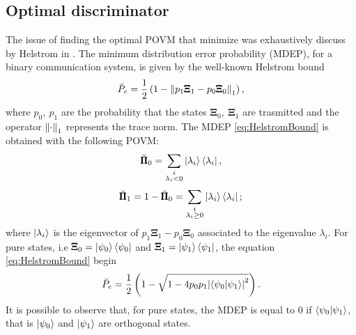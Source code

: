     \subsection{Optimal discriminator}
    The issue of finding the optimal POVM that minimize was exhaustively discuss  by Helstrom in 
    \cite{helstrom3,helstrom4}. The minimum distribution error probability (MDEP), for a binary 
    communication system, is given by the well-known Helstrom bound
    \begin{equation}
        \breve{P}_e = \frac{1}{2} \left(1-\norm{p_1 \pmb{\Xi}_1 - p_0 \pmb{\Xi}_0}_1 \right),
        \label{eq:HelstromBound}
    \end{equation}
    where $p_0,\ p_1$ are the probability that the states $\pmb{\Xi}_0,\ \pmb{\Xi}_1$ are trasmitted
    and the operator $\norm{\cdot}_1$ represents the trace norm. 
    The MDEP \ref{eq:HelstromBound} is obtained with the following POVM:
    \begin{equation}
        \breve{\pmb{\Pi}}_0 = \sum_{\substack{i \\ \lambda_i<0}} \ket{\lambda_i}\bra{\lambda_i},
    \end{equation}
    \begin{equation*}
        \breve{\pmb{\Pi}}_1 = 1-\breve{\pmb{\Pi}}_0 = 
        \sum_{\substack{i \\ \lambda_i \geq 0}} \ket{\lambda_i}\bra{\lambda_i};
    \end{equation*}
    where $\ket{\lambda_i}$ is the eigenvector of $p_1 \pmb{\Xi}_1 - p_0 \pmb{\Xi}_0$ associated to 
    the eigenvalue $\lambda_i$.
    For pure states, i.e $\pmb{\Xi}_0 = \ket{\psi_0}\bra{\psi_0}$ and $\pmb{\Xi}_1 = \ket{\psi_1}
    \bra{\psi_1}$, the equation \ref{eq:HelstromBound} begin
    \begin{equation}
        \breve{P}_e = \frac{1}{2} \left(1- \sqrt{1-4 p_0 p_1 \absolutevalue{\braket{\psi_0}{\psi_1}}^2}
        \right).
    \end{equation}
    It is possible to observe that, for pure states, the MDEP is equal to $0$ if $\braket{\psi_0}{\psi_1}$,
    that is $\ket{\psi_0}$ and $\ket{\psi_1}$ are orthogonal states.